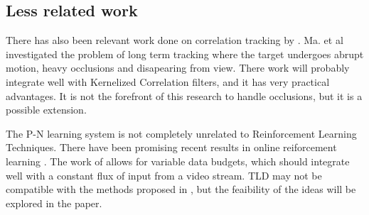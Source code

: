 \subsection{Less related work}
There has also been relevant work done on correlation tracking by \cite{Ma2015Correlation}.
Ma. et al investigated the problem of long term tracking where the target undergoes abrupt motion, heavy occlusions and disapearing from view.
There work will probably integrate well with Kernelized Correlation filters, and it has very practical advantages.
It is not the forefront of this research to handle occlusions, but it is a possible extension.

The P-N learning system is not completely unrelated to Reinforcement Learning Techniques.
There have been promising recent results in online reiforcement learning \cite{onlineRL}.
The work of \cite{onlineRL} allows for variable data budgets, which should integrate well with a constant flux of input from a video stream.
TLD may not be compatible with the methods proposed in \cite{onlineRL}, but the feaibility of the ideas will be explored in the paper.
